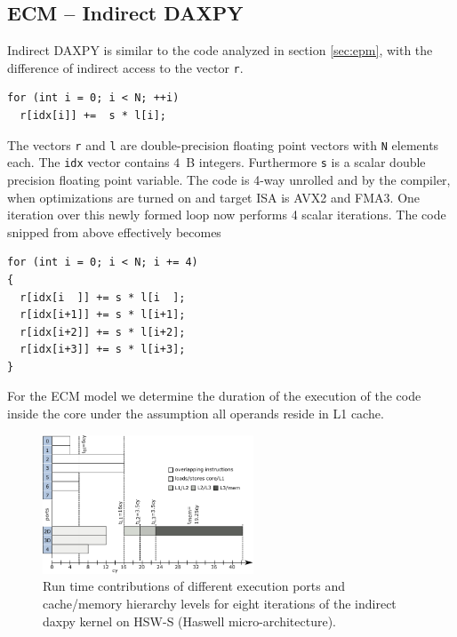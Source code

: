 \subsection{ECM -- Indirect DAXPY}
\label{sec:ecm-indirect-daxpy}

Indirect DAXPY is similar to the code analyzed in section \ref{sec:epm}, with the difference of indirect access to the vector \verb|r|.

%
\begin{lstlisting}
for (int i = 0; i < N; ++i) 
  r[idx[i]] +=  s * l[i];
\end{lstlisting}
%
The vectors \verb'r' and
\verb'l' are double-precision floating point vectors with \verb'N' elements
each. 
The \verb'idx' vector contains $4$~B integers.
Furthermore \verb's' is a scalar double precision floating point variable.
%
The code is 4-way unrolled and by the compiler, when
optimizations are turned on and target ISA is AVX2 and FMA3. One iteration
over this newly formed loop now performs 4 scalar iterations. The code snipped
from above effectively becomes
%
\begin{lstlisting}
for (int i = 0; i < N; i += 4)
{
  r[idx[i  ]] += s * l[i  ];
  r[idx[i+1]] += s * l[i+1];
  r[idx[i+2]] += s * l[i+2];
  r[idx[i+3]] += s * l[i+3];
}
\end{lstlisting}
%
For the ECM model we determine the duration of the execution of the code inside
the core under the assumption all operands reside in L1 cache.

\begin{figure}[tp]
  \centering
  \includegraphics[width=0.56\textwidth,clip=true]{images/ecm-hsw-daxpy-indirect}
  \caption{Run time contributions of different execution ports and cache/memory
hierarchy levels for eight iterations of the indirect daxpy kernel on HSW-S (Haswell micro-architecture).}
  \label{fig:daxpy-indirect:ecm}
\end{figure}

